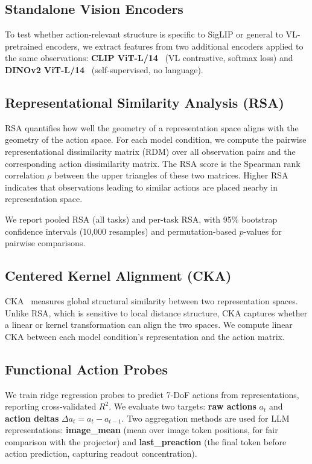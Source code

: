 \documentclass[letterpaper]{article}
\begin{document}
\subsection{Standalone Vision Encoders}

To test whether action-relevant structure is specific to SigLIP or general to VL-pretrained encoders, we extract features from two additional encoders applied to the same observations:
\textbf{CLIP ViT-L/14}~\citep{radford2021clip} (VL contrastive, softmax loss) and
\textbf{DINOv2 ViT-L/14}~\citep{oquab2024dinov2} (self-supervised, no language).

\subsection{Representational Similarity Analysis (RSA)}

RSA quantifies how well the geometry of a representation space aligns with the geometry of the action space.
For each model condition, we compute the pairwise representational dissimilarity matrix (RDM) over all observation pairs and the corresponding action dissimilarity matrix.
The RSA score is the Spearman rank correlation $\rho$ between the upper triangles of these two matrices.
Higher RSA indicates that observations leading to similar actions are placed nearby in representation space.

We report pooled RSA (all tasks) and per-task RSA, with 95\% bootstrap confidence intervals (10,000 resamples) and permutation-based $p$-values for pairwise comparisons.

\subsection{Centered Kernel Alignment (CKA)}

CKA~\citep{kornblith2019cka} measures global structural similarity between two representation spaces.
Unlike RSA, which is sensitive to local distance structure, CKA captures whether a linear or kernel transformation can align the two spaces.
We compute linear CKA between each model condition's representation and the action matrix.

\subsection{Functional Action Probes}

We train ridge regression probes to predict 7-DoF actions from representations, reporting cross-validated $R^2$.
We evaluate two targets: \textbf{raw actions} $a_t$ and \textbf{action deltas} $\Delta a_t = a_t - a_{t-1}$.
Two aggregation methods are used for LLM representations:
\textbf{image\_mean} (mean over image token positions, for fair comparison with the projector) and
\textbf{last\_preaction} (the final token before action prediction, capturing readout concentration).
\end{document}
